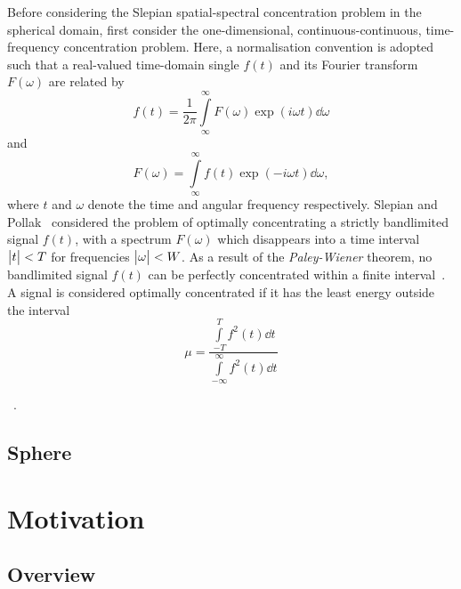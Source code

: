 Before considering the Slepian spatial-spectral concentration problem in the spherical domain, first consider the one-dimensional, continuous-continuous, time-frequency concentration problem.
Here, a normalisation convention is adopted such that a real-valued time-domain single \(f(t)\) and its Fourier transform \(F(\omega)\) are related by
%
\begin{equation}
	f(t)
	= \frac{1}{2\pi} \int\limits_{\infty}^{\infty} F(\omega) \exp(i\omega t) \dd{\omega}
\end{equation}
%
and
%
\begin{equation}
	F(\omega)
	= \int\limits_{\infty}^{\infty} f(t) \exp(-i\omega t) \dd{\omega},
\end{equation}
%
where \(t\) and \(\omega{}\) denote the time and angular frequency respectively.
Slepian and Pollak~\cite{Slepian1961} considered the problem of optimally concentrating a strictly bandlimited signal \(f(t)\), with a spectrum \(F(\omega)\) which disappears into a time interval \(\big\lvert t\big\rvert < T\) for frequencies \(\big\lvert\omega\big\rvert < W\).
As a result of the \emph{Paley-Wiener} theorem, no bandlimited signal \(f(t)\) can be perfectly concentrated within a finite interval~\cite{Daubechies1992,Mallat2008}.
A signal is considered optimally concentrated if it has the least energy outside the interval
%
\begin{equation}
	\mu
	= \frac{\int\limits_{-T}^{T} f^{2}(t) \dd{t}}{\int\limits_{-\infty}^{\infty} f^{2}(t) \dd{t}}
\end{equation}

~\cite{Freeden1997,Riedel1995}.

\subsection{Sphere}







\section{Motivation}

\subsection{Overview}

